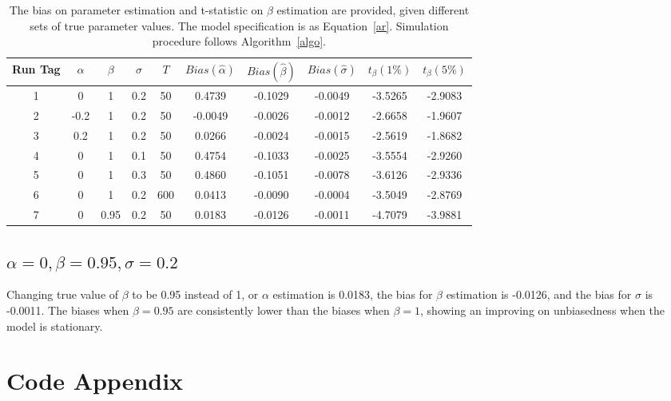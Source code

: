 \documentclass[11pt,reqno,final]{amsart}
\begin{document}
\begin{table}
\begin{center}
\caption{The bias on parameter estimation and t-statistic on $\beta$ estimation are provided, given different sets of true parameter values. The model specification is as Equation~\ref{ar}. Simulation procedure follows Algorithm~\ref{algo}. }
\begin{tabular}{|c|c|c|c|c|c|c|c|c|c|}
  \hline
Run Tag	&	$\alpha$	&	$\beta$	&	$\sigma$	&	$T$	&	$Bias(\hat{\alpha})$	&	$Bias(\hat{\beta})$	&	$Bias(\hat{\sigma})$	&	$t_{\beta}(1\%)$	&	$t_{\beta}(5\%)$	\\ \hline
1	&	0	&	1	&	0.2	&	50	&	0.4739	&	-0.1029	&	-0.0049	&	-3.5265	&	-2.9083	\\
2	&	-0.2	&	1	&	0.2	&	50	&	-0.0049	&	-0.0026	&	-0.0012	&	-2.6658	&	-1.9607	\\
3	&	0.2	&	1	&	0.2	&	50	&	0.0266	&	-0.0024	&	-0.0015	&	-2.5619	&	-1.8682	\\
4	&	0	&	1	&	0.1	&	50	&	0.4754	&	-0.1033	&	-0.0025	&	-3.5554	&	-2.9260	\\
5	&	0	&	1	&	0.3	&	50	&	0.4860	&	-0.1051	&	-0.0078	&	-3.6126	&	-2.9336	\\
6	&	0	&	1	&	0.2	&	600	&	0.0413	&	-0.0090	&	-0.0004	&	-3.5049	&	-2.8769	\\
7	&	0	&	0.95	&	0.2	&	50	&	0.0183	&	-0.0126	&	-0.0011	&	-4.7079	&	-3.9881	\\
  \hline
\end{tabular}\label{tbl::sim_results}
\end{center}
\end{table}


\subsection{$\alpha=0, \beta=0.95, \sigma=0.2$}
Changing true value of $\beta$ to be 0.95 instead of 1, or $\alpha$ estimation is 0.0183, the bias for $\beta$ estimation is -0.0126, and the bias for $\sigma$ is -0.0011. The biases when $\beta=0.95$ are consistently lower than the biases when $\beta=1$, showing an improving on unbiasedness when the model is stationary. 

%
%
%
%
%
%
\newpage
\section*{Code Appendix}

\end{document}
